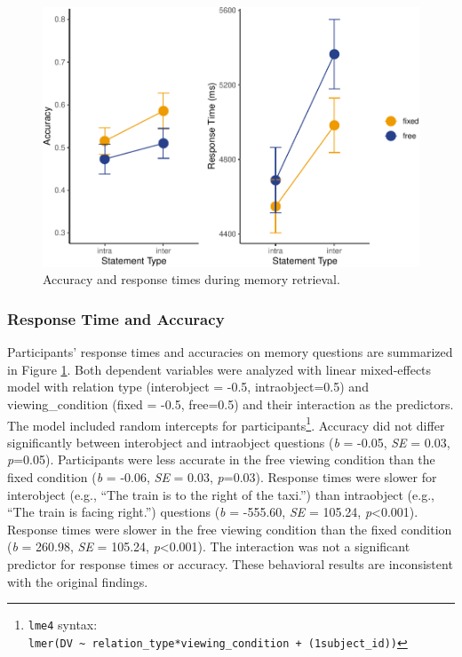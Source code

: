 \documentclass[
  man,floatsintext]{apa6}
\begin{document}
\begin{figure}
\centering
\includegraphics{manuscript_files/figure-latex/E2-rt-acc-fig-1.pdf}
\caption{\label{fig:E2-rt-acc-fig}Accuracy and response times during memory retrieval.}
\end{figure}

\subsubsection{Response Time and Accuracy}\label{response-time-and-accuracy}

Participants' response times and accuracies on memory questions are summarized in Figure \ref{fig:E2-rt-acc-fig}.
Both dependent variables were analyzed with linear mixed-effects model with relation type (interobject = -0.5, intraobject=0.5) and viewing\_condition (fixed = -0.5, free=0.5) and their interaction as the predictors.
The model included random intercepts for participants\footnote{ \texttt{lme4} syntax: \texttt{lmer(DV\ \textasciitilde{}\ relation\_type*viewing\_condition\ +\ (1\textbar{}subject\_id))}}.
Accuracy did not differ significantly between interobject and intraobject questions (\emph{b} = -0.05, \emph{SE} = 0.03, \emph{p}=0.05). Participants were less accurate in the free viewing condition than the fixed condition (\emph{b} = -0.06, \emph{SE} = 0.03, \emph{p}=0.03).
Response times were slower for interobject (e.g., ``The train is to the right of the taxi.'') than intraobject (e.g., ``The train is facing right.'') questions (\emph{b} = -555.60, \emph{SE} = 105.24, \emph{p}\textless0.001). Response times were slower in the free viewing condition than the fixed condition (\emph{b} = 260.98, \emph{SE} = 105.24, \emph{p}\textless0.001).
The interaction was not a significant predictor for response times or accuracy.
These behavioral results are inconsistent with the original findings.
\end{document}
